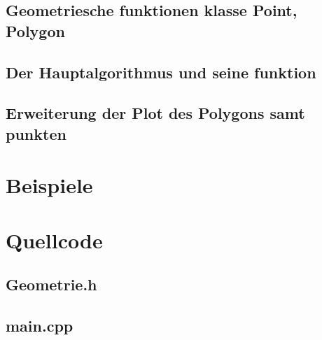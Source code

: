 \documentclass{article}
\begin{document}
\subsection{Geometriesche funktionen klasse Point, Polygon}
\subsection{Der Hauptalgorithmus und seine funktion}
\subsection{Erweiterung der Plot des Polygons samt punkten}
\begin{center}

\end{center}
\section{Beispiele}
\begin{center}

\end{center}
\section{Quellcode}
\subsection{Geometrie.h}
\subsection{main.cpp}
\begin{center}

\end{center}
\end{document}

